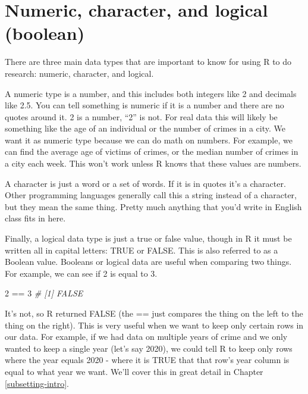 \documentclass[
]{krantz}
\makeatletter
\newenvironment{Shaded}{\begin{snugshade}}{\end{snugshade}}
\newcommand{\CommentTok}[1]{\textcolor[rgb]{0.37,0.37,0.37}{\textit{#1}}}
\newcommand{\DecValTok}[1]{\textcolor[rgb]{0.06,0.06,0.06}{#1}}
\newcommand{\SpecialCharTok}[1]{\textcolor[rgb]{0,0,0}{#1}}
\newenvironment{kframe}{%
\medskip{}
\setlength{\fboxsep}{.8em}
 \def\at@end@of@kframe{}%
 \ifinner\ifhmode%
  \def\at@end@of@kframe{\end{minipage}}%
  \begin{minipage}{\columnwidth}%
 \fi\fi%
 \def\FrameCommand##1{\hskip\@totalleftmargin \hskip-\fboxsep
 \colorbox{shadecolor}{##1}\hskip-\fboxsep
     \hskip-\linewidth \hskip-\@totalleftmargin \hskip\columnwidth}%
 \MakeFramed {\advance\hsize-\width
   \@totalleftmargin\z@ \linewidth\hsize
   \@setminipage}}%
 {\par\unskip\endMakeFramed%
 \at@end@of@kframe}
\renewenvironment{Shaded}{\begin{kframe}}{\end{kframe}}
\makeatother
\begin{document}
\hypertarget{numeric-character-and-logical-boolean}{%
\section{Numeric, character, and logical
(boolean)}\label{numeric-character-and-logical-boolean}}

There are three main data types that are important to know
for using R to do research: numeric, character, and logical.

A numeric type is a number, and this includes both integers
like 2 and decimals like 2.5. You can tell something is
numeric if it is a number and there are no quotes around it.
2 is a number, ``2'' is not. For real data this will likely
be something like the age of an individual or the number of
crimes in a city. We want it as numeric type because we can
do math on numbers. For example, we can find the average age
of victims of crimes, or the median number of crimes in a
city each week. This won't work unless R knows that these
values are numbers.

A character is just a word or a set of words. If it is in
quotes it's a character. Other programming languages
generally call this a string instead of a character, but
they mean the same thing. Pretty much anything that you'd
write in English class fits in here.

Finally, a logical data type is just a true or false value,
though in R it must be written all in capital letters: TRUE
or FALSE. This is also referred to as a Boolean value.
Booleans or logical data are useful when comparing two
things. For example, we can see if 2 is equal to 3.

\begin{Shaded}
\begin{Highlighting}[]
\DecValTok{2} \SpecialCharTok{==} \DecValTok{3}
\CommentTok{\# [1] FALSE}
\end{Highlighting}
\end{Shaded}

It's not, so R returned FALSE (the == just compares the
thing on the left to the thing on the right). This is very
useful when we want to keep only certain rows in our data.
For example, if we had data on multiple years of crime and
we only wanted to keep a single year (let's say 2020), we
could tell R to keep only rows where the year equals 2020 -
where it is TRUE that that row's year column is equal to
what year we want. We'll cover this in great detail in
Chapter \ref{subsetting-intro}.
\end{document}
